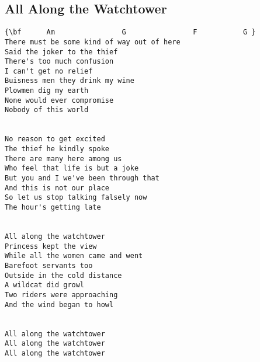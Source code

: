 \documentclass[a4paper]{article}
\begin{document}
\subsection{All Along the Watchtower}
\begin{Verbatim}[commandchars=\\\{\}]
{\bf 	  Am                G                F           G }
There must be some kind of way out of here
Said the joker to the thief
There's too much confusion
I can't get no relief
Buisness men they drink my wine
Plowmen dig my earth
None would ever compromise
Nobody of this world


No reason to get excited
The thief he kindly spoke
There are many here among us
Who feel that life is but a joke
But you and I we've been through that
And this is not our place
So let us stop talking falsely now
The hour's getting late


All along the watchtower
Princess kept the view
While all the women came and went
Barefoot servants too
Outside in the cold distance
A wildcat did growl
Two riders were approaching
And the wind began to howl


All along the watchtower
All along the watchtower
All along the watchtower

\end{Verbatim}
\newpage
\end{document}

